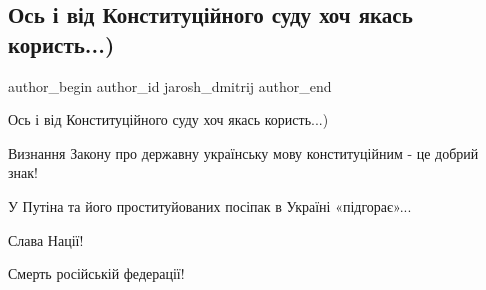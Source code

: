  
 
 
 
 
 
\subsection{Ось і від Конституційного суду хоч якась користь...)}
\label{sec:14_07_2021.fb.jarosh_dmitrij.1.ksu_mova}
 
\ifcmt
 author_begin
   author_id jarosh_dmitrij
 author_end
\fi

Ось і від Конституційного суду хоч якась користь...)

Визнання Закону про державну українську мову конституційним - це добрий знак! 

У Путіна та його проституйованих посіпак в Україні «підгорає»...

Слава Нації!

Смерть російській федерації!

